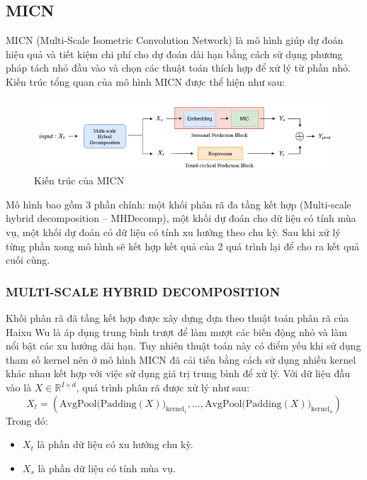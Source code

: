\documentclass[conference]{IEEEtran}
\begin{document}
\subsection{MICN}
MICN (Multi-Scale Isometric Convolution Network) là mô hình giúp dự đoán hiệu quả và tiết kiệm chi phí cho dự đoán dài hạn bằng cách sử dụng phương pháp tách nhỏ đầu vào và chọn các thuật toán thích hợp để xử lý từ phần nhỏ. Kiến trúc tổng quan của mô hình MICN được thể hiện như sau: \cite{MICN}
\begin{figure}[H]
    \centering
    \begin{minipage}{0.8\linewidth}
    \centering
        \includegraphics[width=\linewidth]{images/MICN.png}
    \caption{Kiến trúc của MICN}
    \label{fig11}
    \end{minipage}
\end{figure}
Mô hình bao gồm 3 phần chính: một khối phân rã đa tầng kết hợp (Multi-scale hybrid decomposition – MHDecomp), một khối dự đoán cho dữ liệu có tính mùa vụ, một khối dự đoán có dữ liệu có tính xu hướng theo chu kỳ. Sau khi xử lý từng phần xong mô hình sẽ kết hợp kết quả của 2 quá trình lại để cho ra kết quả cuối cùng.

\subsubsection{MULTI-SCALE HYBRID DECOMPOSITION}
Khối phân rã đã tầng kết hợp được xây dựng dựa theo thuật toán phân rã của Haixu Wu là áp dụng trung bình trượt để làm mượt các biến động nhỏ và làm nổi bật các xu hướng dài hạn. Tuy nhiên thuật toán này có điểm yếu khi sử dụng tham số kernel nên ở mô hình MICN đã cải tiến bằng cách sử dụng nhiều kernel khác nhau kết hợp với việc sử dụng giá trị trung bình để xử lý. Với dữ liệu đầu vào là \( X \in \mathbb{R}^{I \times d} \), quá trình phân rã được xử lý như sau:
\[
X_t=\left( \text{AvgPool(Padding}(X))_{\text{kernel}_1}, \ldots, \text{AvgPool(Padding}(X))_{\text{kernel}_n} \right)
\]
Trong đó:
\begin{itemize}
    \item \( X_t \) là phần dữ liệu có xu hướng chu kỳ.
    \item \( X_s \) là phần dữ liệu có tính mùa vụ.
\end{itemize}
\end{document}
